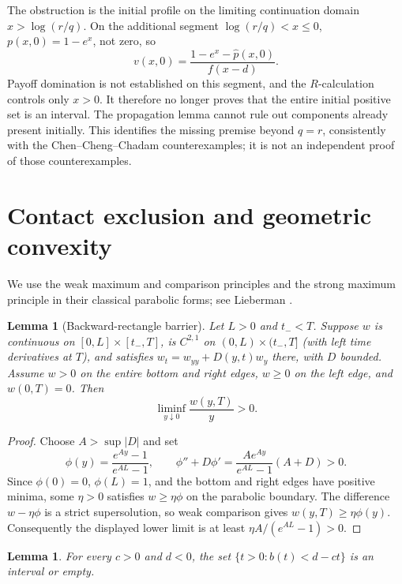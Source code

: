 \documentclass[11pt]{article}
\newtheorem{lemma}[theorem]{Lemma}
\newcommand{\phat}{\widehat p}
\begin{document}
The obstruction is the initial profile on the limiting continuation
domain $x>\log(r/q)$. On the additional segment $\log(r/q)<x\le0$,
$p(x,0)=1-e^x$, not zero, so
\[
  v(x,0)=\frac{1-e^x-\phat(x,0)}{f(x-d)}.
\]
Payoff domination is not established on this segment, and the
$R$-calculation controls only $x>0$. It therefore no longer proves
that the entire initial positive set is an interval. The propagation
lemma cannot rule out components already present initially. This
identifies the missing premise beyond $q=r$, consistently with the
Chen--Cheng--Chadam counterexamples; it is not an independent proof
of those counterexamples.

\section{Contact exclusion and geometric convexity}

We use the weak maximum and comparison principles and the strong
maximum principle in their classical parabolic forms; see
Lieberman \cite[Chapter~II]{Lieberman1996}.

\begin{lemma}[Backward-rectangle barrier]\label{lem:rectangle}
Let $L>0$ and $t_-<T$. Suppose $w$ is continuous on
$[0,L]\times[t_-,T]$, is $C^{2,1}$ on $(0,L)\times(t_-,T]$
(with left time derivatives at $T$), and satisfies
$w_t=w_{yy}+D(y,t)w_y$ there, with $D$ bounded.
Assume $w>0$ on the entire bottom and right edges, $w\ge0$ on the left
edge, and $w(0,T)=0$. Then
\[
  \liminf_{y\downarrow0}\frac{w(y,T)}y>0.
\]
\end{lemma}

\begin{proof}
Choose $A>\sup|D|$ and set
\[
  \phi(y)=\frac{e^{Ay}-1}{e^{AL}-1},\qquad
  \phi''+D\phi'=\frac{Ae^{Ay}}{e^{AL}-1}(A+D)>0.
\]
Since $\phi(0)=0$, $\phi(L)=1$, and the bottom and right edges
have positive minima, some $\eta>0$ satisfies $w\ge\eta\phi$
on the parabolic boundary. The difference $w-\eta\phi$ is a strict
supersolution, so weak comparison gives $w(y,T)\ge\eta\phi(y)$.
Consequently the displayed lower limit is at least
$\eta A/(e^{AL}-1)>0$.
\end{proof}


\begin{lemma}\label{lem:timeinterval}
For every $c>0$ and $d<0$, the set
$\{t>0:b(t)<d-ct\}$ is an interval or empty.
\end{lemma}
\end{document}
